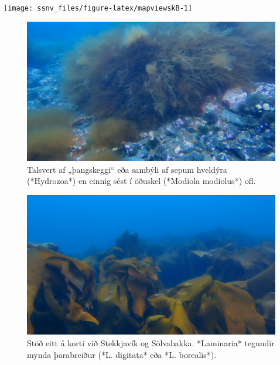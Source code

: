 \documentclass[icelandic,]{book}
\begin{document}
\begin{center}\texttt{[image: ssnv\_files/figure-latex/mapviewskB-1]} \end{center}

\begin{figure}

{\centering \includegraphics[width=1\linewidth]{skjol/skogar/sk2/stodvar/st1/sk2-st1} 

}

\caption{Talsvert af „þangskeggi“ eða sambýli af sepum hveldýra (*Hydrozoa*) en einnig sést í öðuskel (*Modiola modiolus*) ofl. }\label{fig:mynd-sk-tvo-stod-eitt}
\end{figure}

\begin{figure}

{\centering \includegraphics[width=1\linewidth]{skjol/skogar/sk2/stodvar/st1/sk2-st1B} 

}

\caption{Stöð eitt á korti við Stekkjavík og Sölvabakka. *Laminaria* tegundir mynda þarabreiður (*L. digitata* eða *L. borealis*). }\label{fig:mynd-sk-tvo-stod-eittB}
\end{figure}
\end{document}
